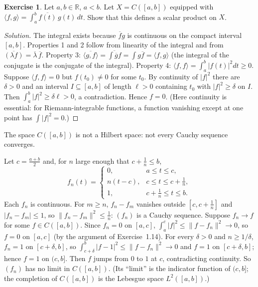\documentclass[11pt,a4paper]{article}
\numberwithin{equation}{section}
\newcommand{\R}{\mathbb{R}}
\newcommand{\ip}[2]{\langle #1, #2\rangle}
\newcommand{\conj}[1]{\overline{#1}}
\theoremstyle{plain}
\theoremstyle{definition}
\newtheorem{exercise}[theorem]{Exercise}
\theoremstyle{plain}
\theoremstyle{definition}
\newenvironment{solution}{\begin{proof}[Solution]}{\end{proof}}
\begin{document}
\begin{exercise}
Let $a,b\in\R$, $a<b$. Let $X=C([a,b])$ equipped with
$\ip{f}{g}=\int_a^b\conj{f(t)}\,g(t)\,dt$. Show that this defines a scalar product on $X$.
\end{exercise}
\begin{solution}
The integral exists because $\conj fg$ is continuous on the compact interval $[a,b]$.
Properties 1 and 2 follow from linearity of the integral and from
$\conj{(\lambda f)}=\conj\lambda\,\conj f$. Property 3:
$\conj{\ip{g}{f}}=\conj{\int\conj gf}=\int g\conj f=\ip{f}{g}$
(the integral of the conjugate is the conjugate of the integral). Property 4:
$\ip{f}{f}=\int_a^b|f(t)|^2dt\ge0$. Suppose $\ip{f}{f}=0$ but $f(t_0)\neq0$ for some
$t_0$. By continuity of $|f|^2$ there are $\delta>0$ and an interval $I\subseteq[a,b]$ of
length $\ell>0$ containing $t_0$ with $|f|^2\ge\delta$ on $I$. Then
$\int_a^b|f|^2\ge\delta\ell>0$, a contradiction. Hence $f=0$.
(Here continuity is essential: for Riemann-integrable functions, a function vanishing
except at one point has $\int|f|^2=0$.)
\end{solution}

The space $C([a,b])$ is not a Hilbert space: not every Cauchy sequence converges.

\begin{addition}
Let $c=\frac{a+b}2$ and, for $n$ large enough that $c+\frac1n\le b$,
\[
f_n(t)=\begin{cases}0,&a\le t\le c,\\ n(t-c),&c\le t\le c+\tfrac1n,\\ 1,&c+\tfrac1n\le t\le b.\end{cases}
\]
Each $f_n$ is continuous. For $m\ge n$, $f_n-f_m$ vanishes outside $[c,c+\frac1n]$ and
$|f_n-f_m|\le1$, so $\|f_n-f_m\|^2\le\frac1n$: $(f_n)$ is a Cauchy sequence.
Suppose $f_n\to f$ for some $f\in C([a,b])$. Since $f_n=0$ on $[a,c]$,
$\int_a^c|f|^2\le\|f-f_n\|^2\to0$, so $f=0$ on $[a,c]$ (by the argument of Exercise~1.14).
For every $\delta>0$ and $n\ge1/\delta$, $f_n=1$ on $[c+\delta,b]$, so
$\int_{c+\delta}^b|f-1|^2\le\|f-f_n\|^2\to0$ and $f=1$ on $[c+\delta,b]$; hence $f=1$ on
$(c,b]$. Then $f$ jumps from $0$ to $1$ at $c$, contradicting continuity. So $(f_n)$ has no
limit in $C([a,b])$. (Its ``limit'' is the indicator function of $(c,b]$; the completion of
$C([a,b])$ is the Lebesgue space $L^2([a,b])$.)
\end{addition}
\end{document}
